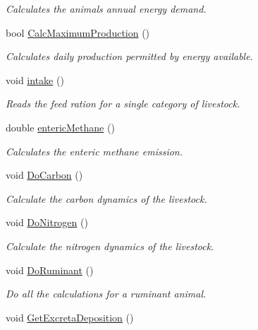 \begin{DoxyCompactItemize}
\begin{DoxyCompactList}\small\item\em Calculates the animal\textquotesingle{}s annual energy demand. \end{DoxyCompactList}\item 
bool \mbox{\hyperlink{classlivestock_a47d7963fe09dec2dcc05a671433e492a}{Calc\+Maximum\+Production}} ()
\begin{DoxyCompactList}\small\item\em Calculates daily production permitted by energy available. \end{DoxyCompactList}\item 
void \mbox{\hyperlink{classlivestock_ad338831b82101e04caa927a1e3c77d0b}{intake}} ()
\begin{DoxyCompactList}\small\item\em Reads the feed ration for a single category of livestock. \end{DoxyCompactList}\item 
double \mbox{\hyperlink{classlivestock_afc3c7bb93fede893404fb7d5d8daa0e3}{enteric\+Methane}} ()
\begin{DoxyCompactList}\small\item\em Calculates the enteric methane emission. \end{DoxyCompactList}\item 
void \mbox{\hyperlink{classlivestock_abe11bf02d5a63a5411eb52c8745bdf5c}{Do\+Carbon}} ()
\begin{DoxyCompactList}\small\item\em Calculate the carbon dynamics of the livestock. \end{DoxyCompactList}\item 
void \mbox{\hyperlink{classlivestock_ac4347842c79f5017c56d3d1dd2ab4d53}{Do\+Nitrogen}} ()
\begin{DoxyCompactList}\small\item\em Calculate the nitrogen dynamics of the livestock. \end{DoxyCompactList}\item 
void \mbox{\hyperlink{classlivestock_aae915d09f0a2e9cb020a6fb59335437a}{Do\+Ruminant}} ()
\begin{DoxyCompactList}\small\item\em Do all the calculations for a ruminant animal. \end{DoxyCompactList}\item 
void \mbox{\hyperlink{classlivestock_a856d571b94958d5dddf73d7f456f39e2}{Get\+Excreta\+Deposition}} ()

\end{DoxyCompactItemize}
